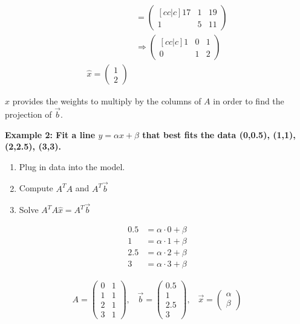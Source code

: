 \begin{align}
    [A^T A | A^T \Vec{b}] &= \begin{pmatrix}[cc|c]
        17 & 1 & 19 \\ 1 & 5 & 11
    \end{pmatrix} \\
    &\Rightarrow \begin{pmatrix}[cc|c]
        1 & 0 & 1 \\
        0 & 1 & 2
    \end{pmatrix} \\
    \hat{x} = \begin{pmatrix}
        1 \\ 2
    \end{pmatrix}
\end{align}

\noindent
\(\hat{x}\) provides the weights to multiply by the columns of \(A\) in order to find the projection of \(\Vec{b}\).

\noindent
\newline
\textbf{Example 2: Fit a line \(y=\alpha x+\beta\) that best fits the data (0,0.5), (1,1), (2,2.5), (3,3).}

\begin{enumerate}
    \item Plug in data into the model.
    \item Compute \(A^T A\) and \(A^T \Vec{b}\)
    \item Solve \(A^T A \hat{x}=A^T \Vec{b}\)
\end{enumerate}

\begin{align}
    0.5 &= \alpha \cdot 0 + \beta \\
    1 &= \alpha \cdot 1 + \beta \\
    2.5 &= \alpha \cdot 2 + \beta \\
    3 &= \alpha \cdot 3 + \beta
\end{align}

\begin{align}
    A = \begin{pmatrix}
        0 & 1 \\ 1 & 1 \\ 2 & 1 \\ 3 & 1
    \end{pmatrix}, \; \; \;
    \Vec{b} = \begin{pmatrix}
        0.5 \\ 1 \\ 2.5 \\ 3
    \end{pmatrix}, \; \; \;
    \Vec{x} = \begin{pmatrix}
        \alpha \\ \beta
    \end{pmatrix}
\end{align}

